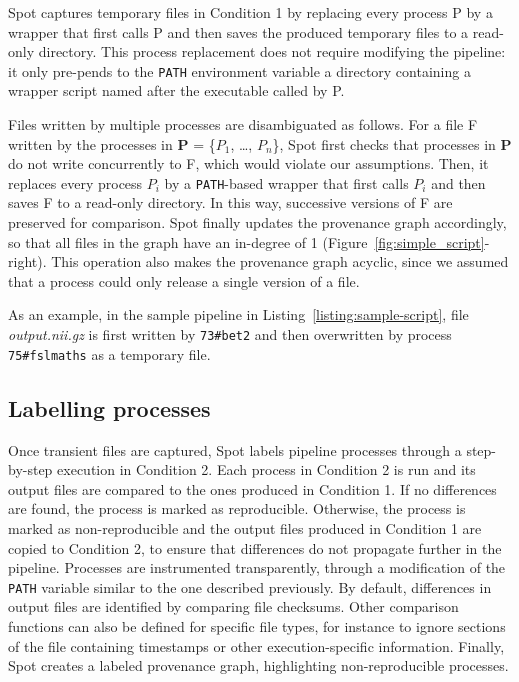 \documentclass[a4paper,num-refs]{oup-contemporary}
\newcommand{\toolname}[0]{Spot\xspace}
\begin{document}
\toolname captures temporary files in Condition 1 by replacing every
process P by a wrapper that first calls P and then saves the produced
temporary files to a read-only directory. This process replacement does not require 
modifying the pipeline: it only pre-pends to the \texttt{PATH} environment
variable a directory containing a wrapper script named after the executable
called by P.

Files written by multiple processes are disambiguated as follows. For a
 file F written by the processes in \textbf{P} = \{$P_{1}$, \ldots,
 $P_{n}$\}, \toolname first checks that processes in \textbf{P} do not
 write concurrently to F, which would violate our assumptions. Then, it
 replaces every process $P_{i}$ by a \texttt{PATH}-based wrapper that first
 calls $P_{i}$ and then saves F to a read-only directory. In this way,
 successive versions of F are preserved for comparison. \toolname finally
 updates the provenance graph accordingly, so that all files in the graph
 have an in-degree of 1 (Figure~\ref{fig:simple_script}-right). This operation also makes the provenance graph
 acyclic, since we assumed that a process could only release a single version of a file.

As an example, in the sample pipeline in
Listing~\ref{listing:sample-script}, file \emph{output.nii.gz} is first written
by \texttt{73\#bet2} and then overwritten by process \texttt{75\#fslmaths} as a temporary file. 

\subsection{Labelling processes} 

Once transient files are captured, \toolname labels pipeline processes
through a step-by-step execution in Condition 2. Each process in Condition
2 is run and its output files are compared to the ones produced in
Condition 1. If no differences are found, the process is marked as
reproducible. Otherwise, the process is marked as non-reproducible and the
output files produced in Condition 1 are copied to Condition 2, to ensure
that differences do not propagate further in the pipeline. Processes are
instrumented transparently, through a modification of the \texttt{PATH}
variable similar to the one described previously. By default, differences
in output files are identified by comparing file checksums. Other
comparison functions can also be defined for specific file types, for
instance to ignore sections of the file containing timestamps or other
execution-specific information. Finally, \toolname creates a labeled
provenance graph, highlighting non-reproducible processes.
\end{document}
